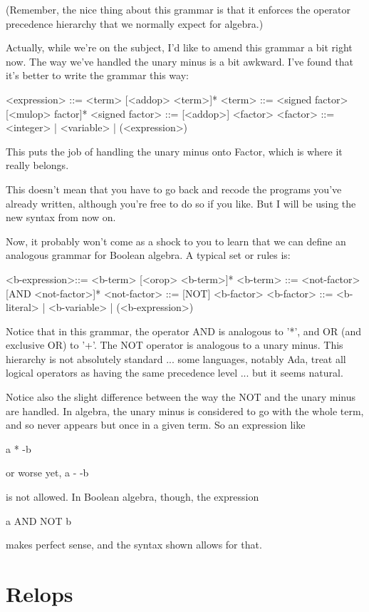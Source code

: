 \documentclass[float=false, crop=false]{standalone}
\begin{document}
(Remember, the nice thing about this grammar is that it enforces the operator
precedence hierarchy that we normally expect for algebra.)

Actually, while we're on the subject, I'd like to amend this grammar a bit right
now. The way we've handled the unary minus is a bit awkward. I've found that
it's better to write the grammar this way:


  <expression>    ::= <term> [<addop> <term>]*
  <term>          ::= <signed factor> [<mulop> factor]*
  <signed factor> ::= [<addop>] <factor>
  <factor>        ::= <integer> | <variable> | (<expression>)


This puts the job of handling the unary minus onto Factor, which is where it
really belongs.

This doesn't mean that you have to go back and recode the programs you've
already written, although you're free to do so if you like. But I will be using
the new syntax from now on.

Now, it probably won't come as a shock to you to learn that we can define an
analogous grammar for Boolean algebra. A typical set or rules is:


 <b-expression>::= <b-term> [<orop> <b-term>]*
 <b-term>      ::= <not-factor> [AND <not-factor>]*
 <not-factor>  ::= [NOT] <b-factor>
 <b-factor>    ::= <b-literal> | <b-variable> | (<b-expression>)


Notice that in this grammar, the operator AND is analogous to '*', and OR (and
exclusive OR) to '+'. The NOT operator is analogous to a unary minus. This
hierarchy is not absolutely standard ... some languages, notably Ada, treat all
logical operators as having the same precedence level ... but it seems natural.

Notice also the slight difference between the way the NOT and the unary minus
are handled. In algebra, the unary minus is considered to go with the whole
term, and so never appears but once in a given term. So an expression like

                    a * -b

or worse yet,
                    a - -b

is not allowed.  In Boolean algebra, though, the expression

                    a AND NOT b

makes perfect sense, and the syntax shown allows for that.


\section{Relops}
\end{document}
